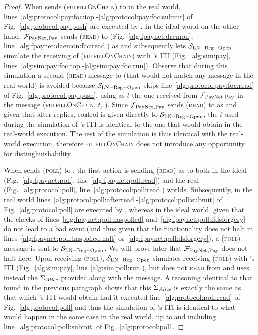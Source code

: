 \begin{proof}
  When \environment{} sends (\textsc{fulfillOnChain}) to \alice{} in the real
  world, lines~\ref{alg:protocol:pay:foc:top}-\ref{alg:protocol:pay:foc:submit}
  of Fig.~\ref{alg:protocol:pay:push} are executed by \alice. In the ideal world
  on the other hand, $\mathcal{F}_{\mathrm{PayNet}}{}_{\mathrm{, Pay}}$ sends (\textsc{read}) to
  \ledger{} (Fig.~\ref{alg:fpaynet:daemon},
  line~\ref{alg:fpaynet:daemon:foc:read}) as \alice{} and subsequently lets
  $\mathcal{S}_{\mathrm{LN - Reg - Open}}$ simulate the receiving of
  (\textsc{fulfillOnChain}) with \alice{}'s ITI (Fig.~\ref{alg:sim:pay},
  lines~\ref{alg:sim:pay:foc:top}-\ref{alg:sim:pay:foc:run}). Observe that
  during this simulation a second (\textsc{read}) message to \ledger{} (that
  would not match any message in the real world) is avoided because
  $\mathcal{S}_{\mathrm{LN - Reg - Open}}$ skips
  line~\ref{alg:protocol:pay:foc:read} of Fig.~\ref{alg:protocol:pay:push},
  using as $t$ the one received from $\mathcal{F}_{\mathrm{PayNet}}{}_{\mathrm{, Pay}}$ in the
  message (\textsc{fulfillOnChain}, $t$, \alice). Since $\mathcal{F}_{\mathrm{PayNet}}{}_{\mathrm{,
  Pay}}$ sends (\textsc{read}) to \ledger{} as \alice{} and given that after
  \ledger{} replies, control is given directly to $\mathcal{S}_{\mathrm{LN - Reg
  - Open}}$, the $t$ used during the simulation of \alice's ITI is identical to
  the one that \alice{} would obtain in the real-world execution. The rest of
  the simulation is thus identical with the real-world execution, therefore
  \textsc{fulfillOnChain} does not introduce any opportunity for
  distinghuishability.

  When \environment{} sends (\textsc{poll}) to \alice, the first action is
  sending (\textsc{read}) as \alice{} to \ledger{} both in the ideal
  (Fig.~\ref{alg:fpaynet:poll}, line~\ref{alg:fpaynet:poll:read}) and the real
  (Fig.~\ref{alg:protocol:poll}, line~\ref{alg:protocol:poll:read}) worlds.
  Subsequently, in the real world
  lines~\ref{alg:protocol:poll:afterread}-\ref{alg:protocol:poll:submit} of
  Fig.~\ref{alg:protocol:poll} are executed by \alice, whereas in the ideal
  world, given that the checks of lines~\ref{alg:fpaynet:poll:haspolled}
  and~\ref{alg:fpaynet:poll:ifdsforgery} do not lead to a bad event (and thus
  given that the functionality does not halt in
  lines~\ref{alg:fpaynet:poll:haspolled:halt}
  or~\ref{alg:fpaynet:poll:dsforgery}), a (\textsc{poll}) message is sent to
  $\mathcal{S}_{\mathrm{LN - Reg - Open}}$. We will prove later that
  $\mathcal{F}_{\mathrm{PayNet}}{}_{\mathrm{, Pay}}$ does not halt here. Upon receiving
  (\textsc{poll}), $\mathcal{S}_{\mathrm{LN - Reg - Open}}$ simulates receiving
  (\textsc{poll}) with \alice's ITI (Fig.~\ref{alg:sim:pay},
  line~\ref{alg:sim:poll:run}), but does not \textsc{read} from \ledger{} and
  uses instead the $\Sigma_{\mathit{Alice}}$ provided along with the message. A
  reasoning identical to that found in the previous paragraph shows that this
  $\Sigma_{\mathit{Alice}}$ is exactly the same as that which \alice's ITI would obtain
  had it executed line~\ref{alg:protocol:poll:read} of
  Fig.~\ref{alg:protocol:poll} and thus the simulation of \alice's ITI is
  identical to what would happen in the same case in the real world, up to and
  including line~\ref{alg:protocol:poll:submit} of Fig.~\ref{alg:protocol:poll}.


\end{proof}
